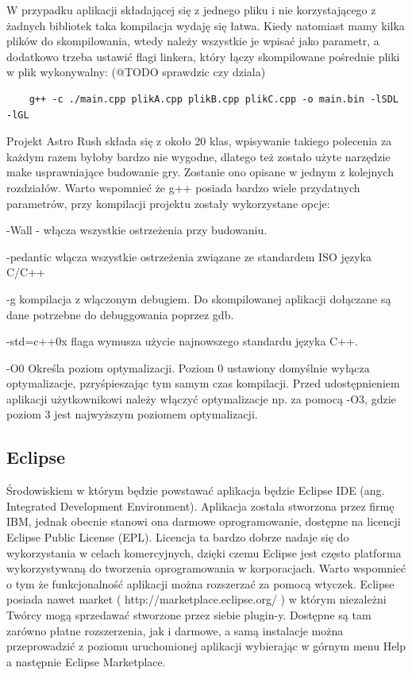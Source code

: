 W przypadku aplikacji składającej się z jednego pliku i nie korzystającego z żadnych bibliotek taka kompilacja wydaję się łatwa.
Kiedy natomiast mamy kilka plików do skompilowania, wtedy należy wszystkie je wpisać jako parametr, a dodatkowo trzeba ustawić 
flagi linkera, który łączy skompilowane pośrednie pliki w plik wykonywalny: (@TODO sprawdzic czy dziala)
\begin{verbatim}
	g++ -c ./main.cpp plikA.cpp plikB.cpp plikC.cpp -o main.bin -lSDL -lGL
\end{verbatim}
Projekt Astro Rush składa się z około 20 klas, wpisywanie takiego polecenia za każdym razem byłoby bardzo nie wygodne, dlatego też zostało użyte narzędzie make usprawniające budowanie gry. Zostanie ono opisane w jednym z kolejnych rozdziałów. Warto wspomnieć że g++ posiada bardzo wiele przydatnych parametrów, przy kompilacji projektu zostały wykorzystane opcje:

-Wall - włącza wszystkie ostrzeżenia przy budowaniu. 

-pedantic wlącza wszystkie ostrzeżenia związane ze standardem ISO języka C/C++

-g kompilacja z wlączonym debugiem. Do skompilowanej aplikacji dołączane są dane potrzebne do debuggowania poprzez gdb. 

-std=c++0x flaga wymusza użycie najnowszego standardu języka C++.


-O0 Określa poziom optymalizacji. Poziom 0 ustawiony domyślnie wyłącza optymalizacje, pzryśpieszając tym samym czas kompilacji. Przed udostępnieniem aplikacji użytkownikowi należy włączyć optymalizacje np. za pomocą -O3, gdzie poziom 3 jest najwyższym poziomem optymalizacji.  




\subsection{Eclipse}
Środowiskiem w którym będzie powstawać aplikacja będzie Eclipse IDE (ang. Integrated Development Environment). Aplikacja została stworzona przez firmę IBM, jednak obecnie stanowi ona darmowe oprogramowanie, dostępne na licencji Eclipse Public License (EPL). Licencja ta bardzo dobrze nadaje się do wykorzystania w celach komercyjnych, dzięki czemu Eclipse jest często platforma wykorzystywaną do tworzenia oprogramowania w korporacjach. Warto wspomnieć o tym że funkcjonalność aplikacji można rozszerzać za pomocą wtyczek. Eclipse posiada nawet market ( http://marketplace.eclipse.org/ ) w którym niezależni Twórcy mogą sprzedawać stworzone przez siebie plugin-y.
Dostępne są tam zarówno płatne rozszerzenia, jak i darmowe, a samą instalacje można przeprowadzić z poziomu uruchomionej aplikacji wybierając w górnym menu Help a następnie Eclipse Marketplace.


